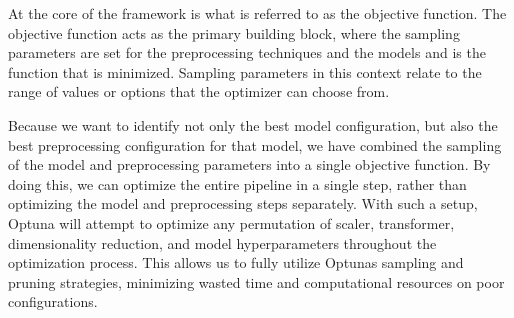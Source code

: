 At the core of the framework is what is referred to as the objective function.
The objective function acts as the primary building block, where the sampling parameters are set for the preprocessing techniques and the models and is the function that is minimized. %
Sampling parameters in this context relate to the range of values or options that the optimizer can choose from.

Because we want to identify not only the best model configuration, but also the best preprocessing configuration for that model, we have combined the sampling of the model and preprocessing parameters into a single objective function.
By doing this, we can optimize the entire pipeline in a single step, rather than optimizing the model and preprocessing steps separately.
With such a setup, Optuna will attempt to optimize any permutation of scaler, transformer, dimensionality reduction, and model hyperparameters throughout the optimization process.
This allows us to fully utilize Optunas sampling and pruning strategies, minimizing wasted time and computational resources on poor configurations.

